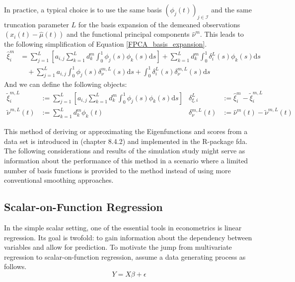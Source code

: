 \documentclass[11pt,twoside,a4paper]{article}
\begin{document}
	In practice, a typical choice is to use the same basis $\left(\phi_j(t)\right)_{j \in \mathcal{I}}$ and the same truncation parameter $L$ for the basis expansion of the demeaned observations $\left(x_i(t) - \hat{\mu}(t)\right)$ and the functional principal components $\hat{\nu}^m$. This leads to the following simplification of Equation \ref{FPCA_basis_expansion}.
	\begin{equation}\label{score_approx}
		\begin{split}
			\hat{\xi}_{i}^m &= \sum_{j = 1}^{L} \left[a_{i,j}\sum_{k = 1}^{L} d_{k}^m \int_{0}^{1} \phi_j(s) \phi_{k}(s)\mathrm{d}s \right] +  \sum_{k = 1}^{L} d_{k}^m \int_{0}^{1} \delta_i^L(s) \phi_{k}(s) \mathrm{d}s \\
			& \quad + \sum_{j = 1}^{L} a_{i,j} \int_{0}^{1}\phi_j(s) \delta_{\nu}^{m,L}(s) \mathrm{d}s + \int_{0}^{1} \delta_i^L(s) \delta_{\nu}^{m,L}(s) \mathrm{d}s
		\end{split}
	\end{equation}
	And we can define the following objects:
		\begin{align}
			\tilde{\xi}^{m,L}_{i} & := \sum_{j = 1}^{L} \left[a_{i,j}\sum_{k = 1}^{L} d_{k}^m \int_{0}^{1} \phi_j(s) \phi_{k}(s)\mathrm{d}s \right] 
			& \delta_{\xi, i}^L & := \hat{\xi}_{i}^m - \tilde{\xi}^{m,L}_{i} \\
			\tilde{\nu}^{m,L}(t) & := \sum_{k = 1}^{L} d_{k}^m \phi_{k}(t) 
			& \delta_{\nu}^{m, L}(t) & := \hat{\nu}^m(t) - \tilde{\nu}^{m,L}(t)
		\end{align}	
	
	This method of deriving or approximating the Eigenfunctions and scores from a data set is introduced in \cite{ramsay_functional_2005} (chapter 8.4.2) and implemented in the R-package fda. The following considerations and results of the simulation study might serve as information about the performance of this method in a scenario where a limited number of basis functions is provided to the method instead of using more conventional smoothing approaches.
	
	\subsection{Scalar-on-Function Regression}\label{Scalar_on_function_regression}
	In the simple scalar setting, one of the essential tools in econometrics is linear regression. Its goal is twofold: to gain information about the dependency between variables and allow for prediction. To motivate the jump from multivariate regression to scalar-on-function regression, assume a data generating process as follows.
	\begin{equation}
		Y = X\beta + \epsilon
	\end{equation}
	
\end{document}
